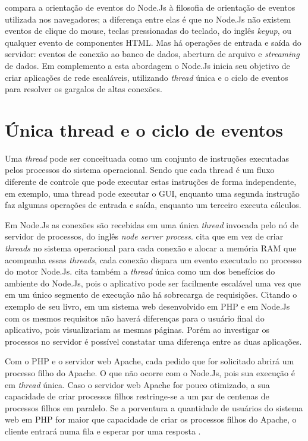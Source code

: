    compara a orientação de eventos do Node.Js à filosofia de orientação 
  de eventos utilizada nos navegadores; a diferença entre elas é que no Node.Js 
  não existem eventos de clique do mouse, teclas pressionadas do teclado, do inglês \textit{keyup}, ou qualquer evento de componentes HTML. 
  Mas há operações de entrada e saída do servidor: eventos de conexão ao banco de dados, abertura de arquivo e \textit{streaming}
  de dados. Em complemento a esta abordagem o Node.Js inicia seu objetivo de criar aplicações de rede escaláveis, utilizando \textit{thread} única
  e o ciclo de eventos para resolver os gargalos de altas conexões.

\section{Única thread e o ciclo de eventos}
\label{single-thread}

  Uma \textit{thread} pode ser conceituada como um conjunto de instruções executadas pelos processos do sistema operacional.
  Sendo que cada thread é um fluxo diferente de controle que pode executar estas instruções de forma independente, em exemplo,
  uma thread pode executar o GUI, enquanto uma segunda instrução faz algumas operações de entrada e saída, 
  enquanto um terceiro executa cálculos. \cite{Lewis:1995}
  
  Em Node.Js as conexões são recebidas em uma única \textit{thread} invocada pelo nó de servidor de processos, do inglês \textit{node server process}.
   cita que em vez de criar \textit{threads}
  no sistema operacional para cada conexão e alocar a memória RAM que acompanha essas \textit{threads}, 
  cada conexão dispara um evento executado no processo do motor Node.Js.   
   cita também a \textit{thread} única como um dos benefícios do ambiente do Node.Js, 
  pois o aplicativo pode ser facilmente escalável uma vez que em um único segmento de execução não há sobrecarga 
  de requisições. Citando o exemplo de seu livro, em um sistema web desenvolvido em \ac{PHP} e em Node.Js com os mesmos requisitos
  não haverá diferenças para o usuário final do aplicativo, pois visualizariam as mesmas páginas. Porém ao investigar 
  os processos no servidor é possível constatar uma diferença entre as duas aplicações.
  
  Com o \ac{PHP} e o servidor web Apache, cada pedido que for solicitado abrirá um processo filho do Apache. O que não ocorre 
  com o Node.Js, pois sua execução é em \textit{thread} única.  Caso o servidor web Apache for pouco otimizado, a sua capacidade 
  de criar processos filhos restringe-se a um par de centenas de processos filhos em paralelo. Se a porventura a quantidade 
  de usuários do sistema web em \ac{PHP} for maior que capacidade de criar os processos filhos do Apache, o cliente entrará 
  numa fila e esperar por uma resposta \cite{Powers:2012}.

